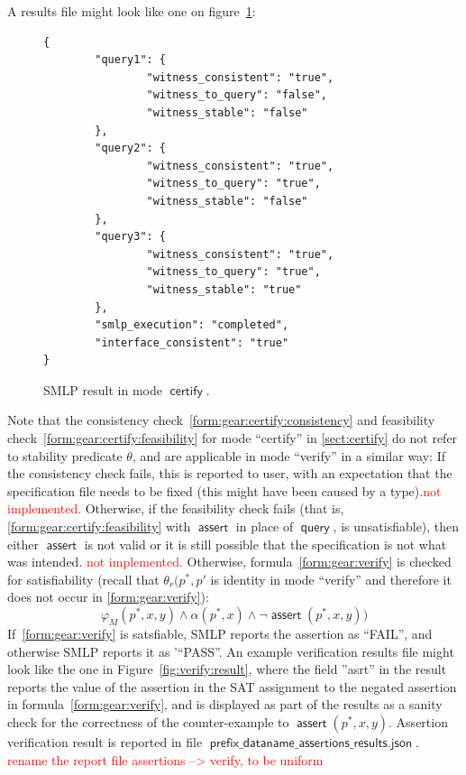 \documentclass[a4paper,parskip=half]{article} %
\newcommand*\query{\operatorname{\mathsf{query}}}
\newcommand*\assert{\operatorname{\mathsf{assert}}}
\newcommand*\suffix[1]{\operatorname{\mathsf{#1}}} %
\newcommand*\mode[1]{\operatorname{\mathsf{#1}}} %
\newcommand\todozk[1]{\textcolor{red}{#1}}
\newcommand*\ZK{\todozk}
\begin{document}
A results file might look like one on figure~\cref{fig:certify:result}:

\begin{figure}[tp]%
\small
\begin{verbatim}
{
        "query1": {
                "witness_consistent": "true",
                "witness_to_query": "false",
                "witness_stable": "false"
        },
        "query2": {
                "witness_consistent": "true",
                "witness_to_query": "true",
                "witness_stable": "false"
        },
        "query3": {
                "witness_consistent": "true",
                "witness_to_query": "true",
                "witness_stable": "true"
        },
        "smlp_execution": "completed",
        "interface_consistent": "true"
}
\end{verbatim}
\caption{SMLP result in mode $\mode{certify}$.}
\label{fig:certify:result}
\end{figure}



Note that the consistency check~\cref{form:gear:certify:consistency} and feasibility check~\cref{form:gear:certify:feasibility} 
for mode ``certify'' in \cref{sect:certify} do not refer to stability predicate $\theta$, and are applicable in mode ``verify'' in a similar way:
If the consistency check fails, this is reported to user, with an expectation that the specification file needs to be fixed 
(this might have been caused by a type).\ZK{not implemented.}  Otherwise, if the feasibility check fails 
(that is, \cref{form:gear:certify:feasibility} with $\assert$ in place of $\query$, is unsatisfiable), then either $\assert$ is not valid 
or it is still possible that the specification is not what was intended. \ZK{not implemented.} 
Otherwise,  formula~\cref{form:gear:verify} is checked for satisfiability 
(recall that $\theta_r(p^*, p'$ is identity in mode ``verify'' and therefore it does not occur in \cref{form:gear:verify}): 
\begin{equation}\label{form:gear:verify}
       \varphi_M(p^*,x,y)  \wedge  \alpha(p^*,x) \wedge  \neg  \assert(p^*,x,y))
\end{equation}
If~\cref{form:gear:verify} is satsfiable, SMLP reports the assertion as ``FAIL'',  and otherwise SMLP reports it as '``PASS''. 
An example verification results file might look like the one in Figure~\cref{fig:verify:result},  where the field ''asrt'' in the result reports 
the value of the assertion in the SAT assignment to the negated assertion in formula~\cref{form:gear:verify}, and is displayed 
as part of the results as a sanity check for the correctness of the counter-example to $\assert(p^*,x,y)$. 
Assertion verification result is reported in file $\suffix{prefix\_dataname\_assertions\_results.json}$.
\ZK{rename the report file assertions --> verify, to be uniform}
\end{document}
